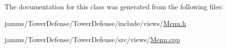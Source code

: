 The documentation for this class was generated from the following files\+:\begin{DoxyCompactItemize}
\item 
jamms/\+Tower\+Defense/\+Tower\+Defense/include/views/\hyperlink{_menu_8h}{Menu.\+h}\item 
jamms/\+Tower\+Defense/\+Tower\+Defense/src/views/\hyperlink{_menu_8cpp}{Menu.\+cpp}\end{DoxyCompactItemize}
